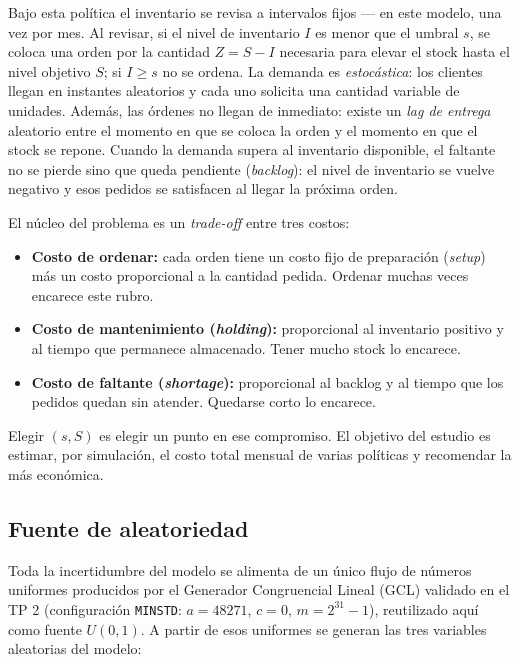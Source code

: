 \documentclass[11pt]{article}
\begin{document}
Bajo esta pol\'itica el inventario se revisa a intervalos fijos --- en este
modelo, una vez por mes. Al revisar, si el nivel de inventario $I$ es menor
que el umbral $s$, se coloca una orden por la cantidad $Z = S - I$ necesaria
para elevar el stock hasta el nivel objetivo $S$; si $I \ge s$ no se ordena.
La demanda es \emph{estoc\'astica}: los clientes llegan en instantes
aleatorios y cada uno solicita una cantidad variable de unidades. Adem\'as,
las \'ordenes no llegan de inmediato: existe un \emph{lag de entrega}
aleatorio entre el momento en que se coloca la orden y el momento en que el
stock se repone. Cuando la demanda supera al inventario disponible, el faltante
no se pierde sino que queda pendiente (\emph{backlog}): el nivel de inventario
se vuelve negativo y esos pedidos se satisfacen al llegar la pr\'oxima orden.

El n\'ucleo del problema es un \emph{trade-off} entre tres costos:

\begin{itemize}
  \item \textbf{Costo de ordenar:} cada orden tiene un costo fijo de
    preparaci\'on (\emph{setup}) m\'as un costo proporcional a la cantidad
    pedida. Ordenar muchas veces encarece este rubro.
  \item \textbf{Costo de mantenimiento (\emph{holding}):} proporcional al
    inventario positivo y al tiempo que permanece almacenado. Tener mucho
    stock lo encarece.
  \item \textbf{Costo de faltante (\emph{shortage}):} proporcional al backlog
    y al tiempo que los pedidos quedan sin atender. Quedarse corto lo
    encarece.
\end{itemize}

Elegir $(s, S)$ es elegir un punto en ese compromiso. El objetivo del estudio
es estimar, por simulaci\'on, el costo total mensual de varias pol\'iticas y
recomendar la m\'as econ\'omica.

\subsection{Fuente de aleatoriedad}

Toda la incertidumbre del modelo se alimenta de un \'unico flujo de n\'umeros
uniformes producidos por el Generador Congruencial Lineal (GCL) validado en el
TP 2 (configuraci\'on \texttt{MINSTD}: $a = 48271$, $c = 0$, $m = 2^{31}-1$),
reutilizado aqu\'i como fuente $U(0,1)$. A partir de esos uniformes se generan
las tres variables aleatorias del modelo:
\end{document}
